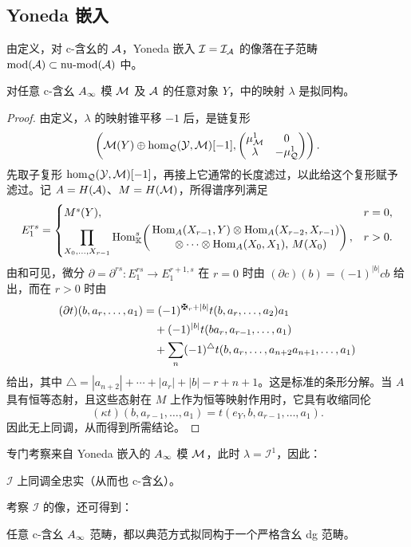 \subsection{Yoneda 嵌入}\label{sec:2g}
由定义，对 c-含幺的 $\mathcal A$，Yoneda 嵌入 $\mathcal I=\mathcal I_{\mathcal A}$ 的像落在子范畴 $\operatorname{mod}(\mathcal A)\subset\operatorname{nu\text{-}mod}(\mathcal A)$ 中。
\begin{lemma}\label{st:2.12}
对任意 c-含幺 $A_\infty$ 模 $\mathcal M$ 及 $\mathcal A$ 的任意对象 $Y$，中的映射 $\lambda$ 是拟同构。
\end{lemma}
\begin{proof}
由定义，$\lambda$ 的映射锥平移 $-1$ 后，是链复形
\begin{equation}\label{eq:2.12}
\left(\mathcal M(Y)\oplus\hom_{\mathcal Q}(\mathcal Y,\mathcal M)[-1],\begin{pmatrix}\mu^1_{\mathcal M}&0\\\lambda&-\mu^1_{\mathcal Q}\end{pmatrix}\right).
\end{equation}
先取子复形 $\hom_{\mathcal Q}(\mathcal Y,\mathcal M)[-1]$，再接上它通常的长度滤过，以此给这个复形赋予滤过。记 $A=H(\mathcal A)$、$M=H(\mathcal M)$，所得谱序列满足
\[
E_1^{rs}=\begin{cases}
M^s(Y),&r=0,\\[3pt]
\displaystyle\prod_{X_0,\ldots,X_{r-1}}\operatorname{Hom}^s_{\mathbb K}\!\left(\begin{aligned}&\operatorname{Hom}_A(X_{r-1},Y)\otimes\operatorname{Hom}_A(X_{r-2},X_{r-1})\\[-2pt]&\qquad\otimes\cdots\otimes\operatorname{Hom}_A(X_0,X_1),\,M(X_0)\end{aligned}\right),&r>0.
\end{cases}
\]
由和可见，微分 $\partial=\partial^{rs}:E_1^{rs}\to E_1^{r+1,s}$ 在 $r=0$ 时由 $(\partial c)(b)=(-1)^{|b|}cb$ 给出，而在 $r>0$ 时由
\[
\begin{aligned}
(\partial t)(b,a_r,\ldots,a_1)
&=(-1)^{\sgnmark_r+|b|}t(b,a_r,\ldots,a_2)a_1\\
&\quad+(-1)^{|b|}t(ba_r,a_{r-1},\ldots,a_1)\\
&\quad+\sum_n(-1)^{\triangle} t(b,a_r,\ldots,a_{n+2}a_{n+1},\ldots,a_1)
\end{aligned}
\]
给出，其中 $\triangle=|a_{n+2}|+\cdots+|a_r|+|b|-r+n+1$。这是标准的条形分解。当 $A$ 具有恒等态射，且这些态射在 $M$ 上作为恒等映射作用时，它具有收缩同伦
\[
(\kappa t)(b,a_{r-1},\ldots,a_1)=t(e_Y,b,a_{r-1},\ldots,a_1).
\]
因此无上同调，从而得到所需结论。
\end{proof}

专门考察来自 Yoneda 嵌入的 $A_\infty$ 模 $\mathcal M$，此时 $\lambda=\mathcal I^1$，因此：
\begin{corollary}\label{st:2.13}
$\mathcal I$ 上同调全忠实（从而也 c-含幺）。
\end{corollary}
考察 $\mathcal I$ 的像，还可得到：
\begin{corollary}\label{st:2.14}
任意 c-含幺 $A_\infty$ 范畴，都以典范方式拟同构于一个严格含幺 dg 范畴。
\end{corollary}

